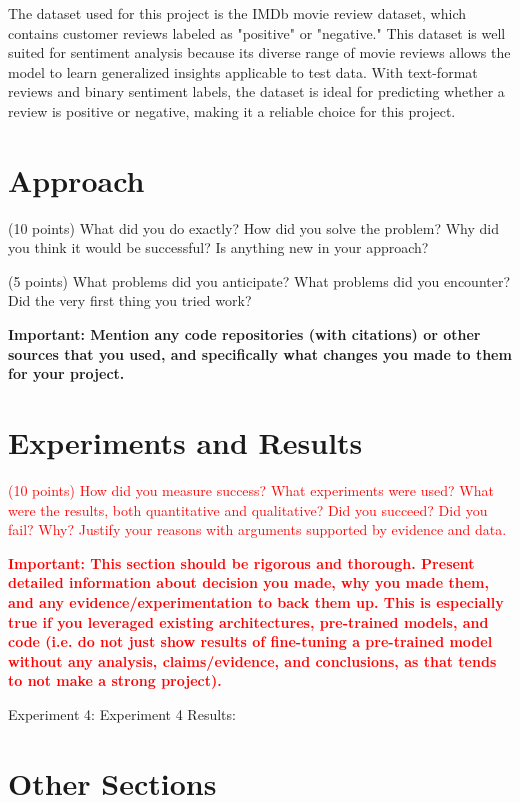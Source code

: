 \documentclass[10pt,twocolumn,letterpaper]{article}
\begin{document}
The dataset used for this project is the IMDb movie review dataset, which contains customer reviews labeled as "positive" or "negative." This dataset is well suited for sentiment analysis because its diverse range of movie reviews allows the model to learn generalized insights applicable to test data. With text-format reviews and binary sentiment labels, the dataset is ideal for predicting whether a review is positive or negative, making it a reliable choice for this project.
\section{Approach}

(10 points) What did you do exactly? How did you solve the problem? Why did you think it would be successful? Is anything new in your approach? 

(5 points) What problems did you anticipate? What problems did you encounter? Did the very first thing you tried work? 

\textbf{Important: Mention any code repositories (with citations) or other sources that you used, and specifically what changes you made to them for your project. }

\section{Experiments and Results}

\textcolor{red}{(10 points) How did you measure success? What experiments were used? What were the results, both quantitative and qualitative? Did you succeed? Did you fail? Why? Justify your reasons with arguments supported by evidence and data.}

\textcolor{red}{\textbf{Important: This section should be rigorous and thorough. Present detailed information about decision you made, why you made them, and any evidence/experimentation to back them up. This is especially true if you leveraged existing architectures, pre-trained models, and code (i.e. do not just show results of fine-tuning a pre-trained model without any analysis, claims/evidence, and conclusions, as that tends to not make a strong project). }}

Experiment 4:
Experiment 4 Results: 

\section{Other Sections}
\end{document}
